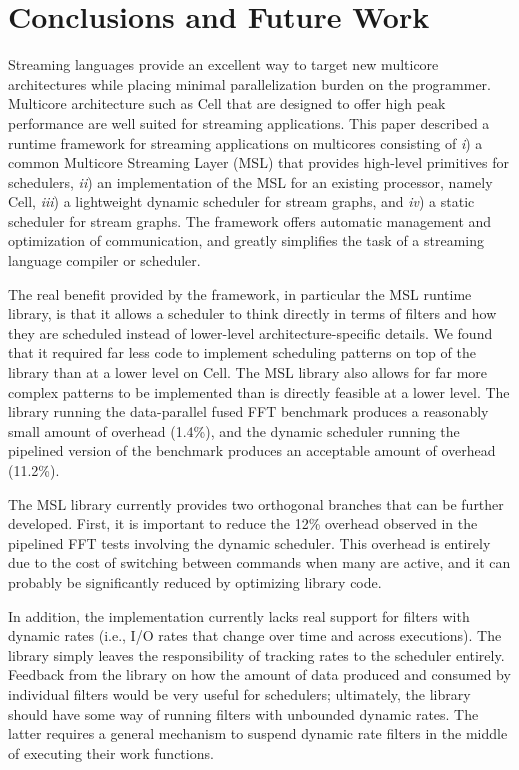 \section{Conclusions and Future Work}\label{ch:conc}

Streaming languages provide an excellent way to
target new multicore architectures while placing minimal
parallelization burden on the programmer. Multicore architecture such
as Cell that are designed to offer high peak performance are well
suited for streaming applications. This paper described a runtime
framework for streaming applications on multicores consisting of
\emph{i}) a common Multicore Streaming Layer (MSL) that provides
high-level primitives for schedulers, \emph{ii}) an implementation
of the MSL for an existing processor, namely Cell, \emph{iii}) a
lightweight dynamic scheduler for stream graphs, and \emph{iv}) a
static scheduler for stream graphs. The framework offers automatic
management and optimization of communication, and greatly
simplifies the task of a streaming language compiler or scheduler.

The real benefit provided by the framework, in particular the MSL
runtime library, is that it allows a scheduler to think directly in
terms of filters and how they are scheduled instead of lower-level
architecture-specific details. We found that it required
far less code to implement scheduling patterns on top of the library
than at a lower level on Cell. The MSL library also
allows for far more complex patterns to be implemented than is
directly feasible at a lower level. The library running the
data-parallel fused FFT benchmark produces a reasonably small amount
of overhead (1.4\%), and the dynamic scheduler running the pipelined
version of the benchmark produces an acceptable amount of overhead
(11.2\%).

The MSL library currently provides two orthogonal branches that can be
further developed. First, it is important to reduce the 12\% overhead
observed in the pipelined FFT tests involving the dynamic
scheduler. This overhead is entirely due to the cost of switching
between commands when many are active, and it can probably be significantly
reduced by optimizing library code.

In addition, the implementation currently lacks real support for
filters with dynamic rates (i.e., I/O rates that change over time and
across executions). The library simply leaves the responsibility of
tracking rates to the scheduler entirely. Feedback from the library on
how the amount of data produced and consumed by individual filters
would be very useful for schedulers; ultimately, the library should
have some way of running filters with unbounded dynamic rates. The
latter requires a general mechanism to suspend dynamic rate filters in
the middle of executing their work functions.

